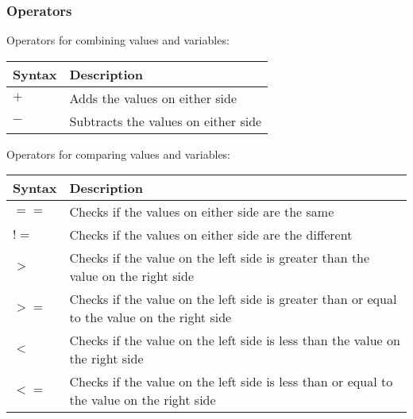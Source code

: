 		\subsubsection{Operators}
			Operators for combining values and variables:
			\begin{center} \begin{tabular}{| l | p{10cm} |} \hline
				Syntax & Description \\ \hline
				$+$    & Adds the values on either side\\ \hline
				$-$    & Subtracts the values on either side\\ \hline
			\end{tabular} \end{center}
			Operators for comparing values and variables:
			\begin{center} \begin{tabular}{| l | p{10cm} |} \hline
				Syntax & Description \\ \hline
				$==$   & Checks if the values on either side are the same\\ \hline
				$!=$   & Checks if the values on either side are the different\\ \hline
				$>$    & Checks if the value on the left side is greater than the value on the right side\\ \hline
				$>=$   & Checks if the value on the left side is greater than or equal to the value on the right side\\ \hline
				$<$    & Checks if the value on the left side is less than the value on the right side\\ \hline
				$<=$   & Checks if the value on the left side is less than or equal to the value on the right side\\ \hline
			\end{tabular} \end{center}
